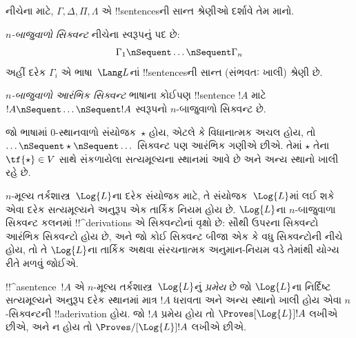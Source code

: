 \documentclass[../../../include/open-logic-section]{subfiles}
\begin{document}


નીચેના માટે, $\Gamma, \Delta, \Pi, \Lambda$ એ !!{sentence}sની
સાન્ત શ્રેણીઓ દર્શાવે તેમ માનો.

\begin{defn}[સિક્વન્ટ]
\emph{$n$-બાજુવાળો સિક્વન્ટ} નીચેના સ્વરૂપનું પદ છે:
\[
\Gamma_1 \nSequent \dots \nSequent \Gamma_n
\]
અહીં દરેક $\Gamma_i$ એ ભાષા~$\Lang L$નાં !!{sentence}sની
સાન્ત (સંભવતઃ ખાલી) શ્રેણી છે.
\end{defn}

\begin{defn}[આરંભિક સિક્વન્ટ]
\emph{$n$-બાજુવાળો આરંભિક સિક્વન્ટ} ભાષાના કોઈપણ
!!{sentence} $!A$ માટે $!A \nSequent \dots \nSequent !A$
સ્વરૂપનો $n$-બાજુવાળો સિક્વન્ટ છે.

જો ભાષામાં $0$-સ્થાનવાળો સંયોજક~$\star$ હોય, એટલે
કે વિધાનાત્મક અચલ હોય, તો $\dots \nSequent
\star \nSequent \dots$ સિક્વન્ટ પણ આરંભિક ગણીએ છીએ.
તેમાં $\star$ તેના $\tf{\star} \in V$ સાથે સંકળાયેલા
સત્યમૂલ્યના સ્થાનમાં આવે છે અને અન્ય સ્થાનો ખાલી રહે છે.
\end{defn}

$n$-મૂલ્ય તર્કશાસ્ત્ર~$\Log{L}$ના દરેક સંયોજક માટે,
તે સંયોજક~$\Log{L}$માં લઈ શકે એવા દરેક સત્યમૂલ્યને
અનુરૂપ એક તાર્કિક નિયમ હોય છે. $\Log{L}$ના $n$-બાજુવાળા
સિક્વન્ટ કલનમાં !!^{derivation}s એ સિક્વન્ટોનાં વૃક્ષો છે:
સૌથી ઉપરના સિક્વન્ટો આરંભિક સિક્વન્ટો હોય છે, અને
જો કોઈ સિક્વન્ટ બીજા એક કે વધુ સિક્વન્ટોની નીચે હોય,
તો તે $\Log{L}$ના તાર્કિક અથવા સંરચનાત્મક અનુમાન-નિયમ વડે તેમાંથી
યોગ્ય રીતે મળવું જોઈએ.

\begin{defn}[પ્રમેયો]
!!^a{sentence}~$!A$ એ $n$-મૂલ્ય તર્કશાસ્ત્ર~$\Log{L}$નું
\emph{પ્રમેય} છે જો $\Log{L}$ના નિર્દિષ્ટ સત્યમૂલ્યને
અનુરૂપ દરેક સ્થાનમાં માત્ર $!A$ ધરાવતા અને અન્ય
સ્થાનો ખાલી હોય એવા $n$-સિક્વન્ટની
!!a{derivation} હોય. જો $!A$ પ્રમેય હોય તો
$\Proves[\Log{L}] !A$ લખીએ છીએ, અને ન હોય તો
$\Proves/[\Log{L}] !A$ લખીએ છીએ.
\end{defn}
\end{document}
